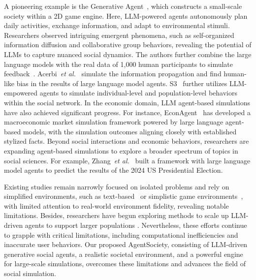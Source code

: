 A pioneering example is the Generative Agent~\cite{park2023generative}, which constructs a small-scale society within a 2D game engine. Here, LLM-powered agents autonomously plan daily activities, exchange information, and adapt to environmental stimuli. Researchers observed intriguing emergent phenomena, such as self-organized information diffusion and collaborative group behaviors, revealing the potential of LLMs to capture nuanced social dynamics. The authors further combine the large language models with the real data of 1,000 human participants to simulate feedback~\cite{park2024generative}. Acerbi~\textit{et al.}~\cite{acerbi2023large} simulate the information propagation and find human-like bias in the results of large language model agents. 
 S3~\cite{gao2023s} further utilizes LLM-empowered agents to simulate individual-level and population-level behaviors within the social network. In the economic domain, LLM agent-based simulations have also achieved significant progress. For instance, EconAgent~\cite{li2024econagent} has developed a macroeconomic market simulation framework powered by large language agent-based models, with the simulation outcomes aligning closely with established stylized facts. 
Beyond social interactions and economic behaviors, researchers are expanding agent-based simulations to explore a broader spectrum of topics in social sciences. For example, Zhang~\textit{et al.}~\cite{zhang2024electionsim} built a framework with large language model agents to predict the results of the 2024 US Presidential Election.

Existing studies remain narrowly focused on isolated problems and rely on simplified environments, such as text-based~\cite{aher2023using} or simplistic game environments~\cite{park2023generative}, with limited attention to real-world environment fidelity, revealing notable limitations. Besides, researchers have begun exploring methods to scale up LLM-driven agents to support larger populations \cite{tang2024gensim,wang2024user,yang2024oasis}. Nevertheless, these efforts continue to grapple with critical limitations, including computational inefficiencies and inaccurate user behaviors. Our proposed AgentSociety, consisting of LLM-driven generative social agents, a realistic societal environment, and a powerful engine for large-scale simulations, overcomes these limitations and advances the field of social simulation.


